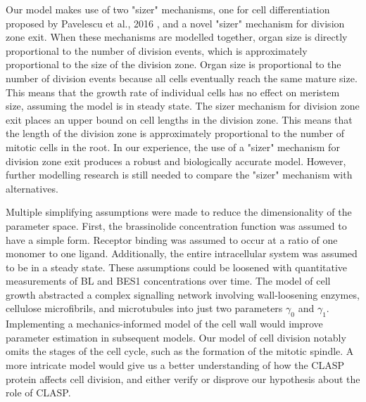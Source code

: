 \documentclass[referee,pdflatex,sn-mathphys-num]{sn-jnl}
\begin{document}
Our model makes use of two "sizer" mechanisms, one for cell differentiation proposed by Pavelescu et al., 2016 \cite{pavelescu2016}, and a novel "sizer" mechanism for division zone exit.  When these mechanisms are modelled together, organ size is directly proportional to the number of division events, which is approximately proportional to the size of the division zone. Organ size is proportional to the number of division events because all cells eventually reach the same mature size. This means that the growth rate of individual cells has no effect on meristem size, assuming the model is in steady state. The sizer mechanism for division zone exit places an upper bound on cell lengths in the division zone. This means that the length of the division zone is approximately proportional to the number of mitotic cells in the root. In our experience, the use of a "sizer" mechanism for division zone exit produces a robust and biologically accurate model. However, further modelling research is still needed to compare the "sizer" mechanism with alternatives.
 
Multiple simplifying assumptions were made to reduce the dimensionality of the parameter space. First, the brassinolide concentration function was assumed to have a simple form. Receptor binding was assumed to occur at a ratio of one monomer to one ligand. Additionally, the entire intracellular system was assumed to be in a steady state. These assumptions could be loosened with quantitative measurements of BL and BES1 concentrations over time. The model of cell growth abstracted a complex signalling network involving wall-loosening enzymes, cellulose microfibrils, and microtubules \cite{smithers2024} into just two parameters $\gamma_{0}$ and $\gamma_{1}$. Implementing a mechanics-informed model of the cell wall would improve parameter estimation in subsequent models. Our model of cell division notably omits the stages of the cell cycle, such as the formation of the mitotic spindle. A more intricate model would give us a better understanding of how the CLASP protein affects cell division, and either verify or disprove our hypothesis about the role of CLASP.
\end{document}
